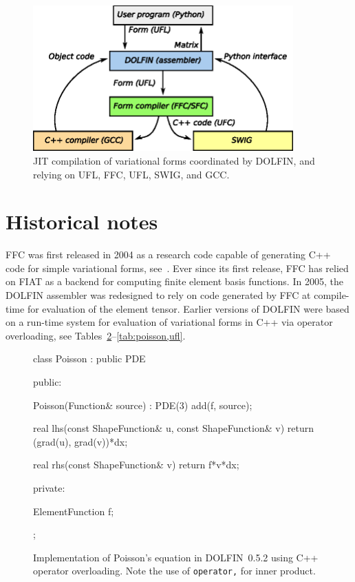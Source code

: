 \begin{figure}
  \begin{center}
    \includegraphics[width=10cm]{chapters/logg-1/eps/jit.eps}
    \caption{JIT compilation of variational forms coordinated by
      DOLFIN, and relying on UFL, FFC, UFL, SWIG, and GCC.}
    \label{fig:jit}
  \end{center}
\end{figure}

\section{Historical notes}

FFC was first released in 2004 as a research code capable of
generating C++ code for simple variational forms,
see~\cite{KirbyLogg2006,KirbyLogg2007}. Ever since its first release,
FFC has relied on FIAT as a backend for computing finite element basis
functions. In 2005, the DOLFIN assembler was redesigned to rely on
code generated by FFC at compile-time for evaluation of the element
tensor. Earlier versions of DOLFIN were based on a run-time system for
evaluation of variational forms in C++ via operator overloading, see
Tables~\ref{tab:poisson,before}--\ref{tab:poisson,ufl}.

\begin{figure}
  \begin{center}
\begin{code}
  class Poisson : public PDE
  {
  public:

    Poisson(Function& source) : PDE(3)
    {
      add(f, source);
    }

    real lhs(const ShapeFunction& u, const ShapeFunction& v)
    {
      return (grad(u), grad(v))*dx;
    }

    real rhs(const ShapeFunction& v)
    {
      return f*v*dx;
    }

  private:

    ElementFunction f;

  };
\end{code}
  \caption{Implementation of Poisson's equation in DOLFIN~0.5.2 using C++ operator overloading.
           Note the use of \texttt{operator,} for inner product.}
  \label{tab:poisson,before}
  \end{center}
\end{figure}

